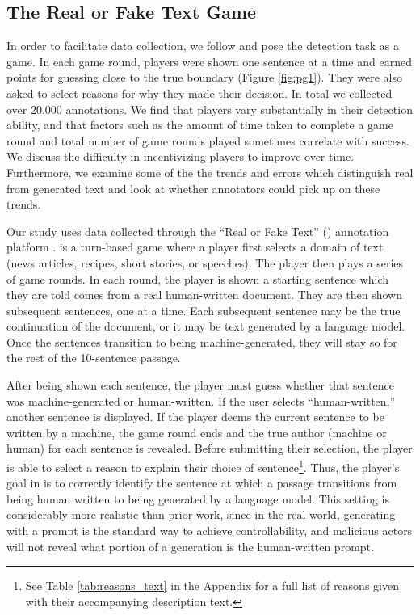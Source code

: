 \subsection{The Real or Fake Text Game}
In order to facilitate data collection, we follow \citet{roft} and pose the detection task as a game.
In each game round, players were shown one sentence at a time and earned points for guessing close to the true boundary (Figure \ref{fig:pg1}).
They were also asked to select reasons for why they made their decision.
In total we collected over 20,000 annotations.
We find that players vary substantially in their detection ability, and that factors such as the amount of time taken to complete a game round and total number of game rounds played sometimes correlate with success.
We discuss the difficulty in incentivizing players to improve over time.
Furthermore, we examine some of the the trends and errors which distinguish real from generated text and look at whether annotators could pick up on these trends.



Our study uses data collected through the ``Real or Fake Text'' (\ROFT{}) annotation platform \citep{roft}.
\ROFT{} is a turn-based game where a player first selects a domain of text (news articles, recipes, short stories, or speeches).
The player then plays a series of game rounds.
In each round, the player is shown a starting sentence which they are told comes from a real human-written document.
They are then shown subsequent sentences, one at a time.
Each subsequent sentence may be the true continuation of the document, or it may be text generated by a language model.
Once the sentences transition to being machine-generated, they will stay so for the rest of the 10-sentence passage.

After being shown each sentence, the player must guess whether that sentence was machine-generated or human-written.
If the user selects ``human-written,'' another sentence is displayed.
If the player deems the current sentence to be written by a machine, the game round ends and the true author (machine or human) for each sentence is revealed.
Before submitting their selection, the player is able to select a reason to explain their choice of sentence\footnote{See Table \ref{tab:reasons_text} in the Appendix for a full list of reasons given with their accompanying description text.}.
Thus, the player's goal in \ROFT{} is to correctly identify the sentence at which a passage transitions from being human written to being generated by a language model.
This setting is considerably more realistic than prior work, since in the real world, generating with a prompt is the standard way to achieve controllability, and malicious actors will not reveal what portion of a generation is the human-written prompt.

